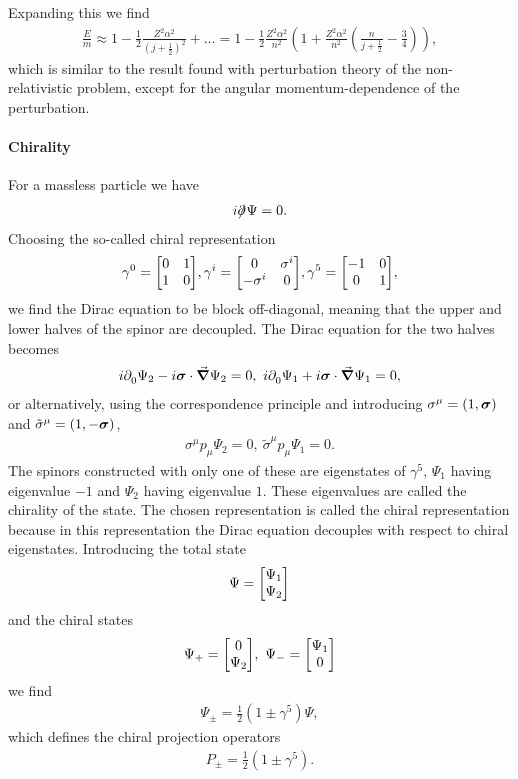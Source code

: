 Expanding this we find
\begin{align*}
	\frac{E}{m} \approx 1 - \frac{1}{2}\frac{Z^{2}\alpha^{2}}{\left(j + \frac{1}{2}\right)^{2}} + \dots = 1 - \frac{1}{2}\frac{Z^{2}\alpha^{2}}{n^{2}}\left(1 + \frac{Z^{2}\alpha^{2}}{n^{2}}\left(\frac{n}{j + \frac{1}{2}} - \frac{3}{4}\right)\right),
\end{align*}
which is similar to the result found with perturbation theory of the non-relativistic problem, except for the angular momentum-dependence of the perturbation.

\paragraph{Chirality}
For a massless particle we have
\begin{align*}
	i\slashed{\partial^{}_{}}\Psi = 0.
\end{align*}
Choosing the so-called chiral representation
\begin{align*}
	\gamma^{0} = \mqty[
		0 & 1 \\
		1 & 0
	], \gamma^{i} = \mqty[
		0           & \sigma^{i} \\
		-\sigma^{i} & 0
	],\gamma^{5} = \mqty[
		-1 & 0 \\
		0  & 1
	],
\end{align*}
we find the Dirac equation to be block off-diagonal, meaning that the upper and lower halves of the spinor are decoupled. The Dirac equation for the two halves becomes
\begin{align*}
	i\del{}{0}\Psi_{2} - i\vb*{\sigma}\cdot\grad\Psi_{2} = 0,\ i\del{}{0}\Psi_{1} + i\vb*{\sigma}\cdot\grad\Psi_{1} = 0,
\end{align*}
or alternatively, using the correspondence principle and introducing $\sigma^{\mu} = (1, \vb*{\sigma})$ and $\tilde{\sigma}^{\mu} = (1, -\vb*{\sigma})$,
\begin{align*}
	\sigma^{\mu}p_{\mu}\Psi_{2} = 0,\ \tilde{\sigma}^{\mu}p_{\mu}\Psi_{1} = 0.
\end{align*}
The spinors constructed with only one of these are eigenstates of $\gamma^{5}$, $\Psi_{1}$ having eigenvalue $-1$ and $\Psi_{2}$ having eigenvalue $1$. These eigenvalues are called the chirality of the state. The chosen representation is called the chiral representation because in this representation the Dirac equation decouples with respect to chiral eigenstates. Introducing the total state
\begin{align*}
	\Psi = \mqty[
		\Psi_{1} \\
		\Psi_{2}
	]
\end{align*}
and the chiral states
\begin{align*}
	\Psi_{+} = \mqty[
		0 \\
		\Psi_{2}
	],\ \Psi_{-} = \mqty[
		\Psi_{1} \\
		0
	]
\end{align*}
we find
\begin{align*}
	\Psi_{\pm} = \frac{1}{2}(1 \pm \gamma^{5})\Psi,
\end{align*}
which defines the chiral projection operators
\begin{align*}
	P_{\pm} =  \frac{1}{2}(1 \pm \gamma^{5}).
\end{align*}

